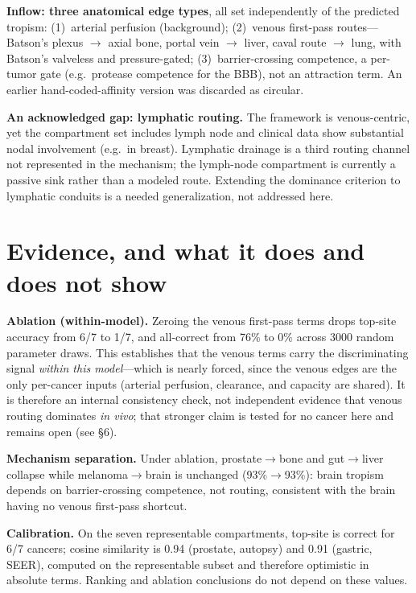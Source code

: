 \documentclass[11pt]{article}
\begin{document}
\textbf{Inflow: three anatomical edge types}, all set independently of the
predicted tropism: (1)~arterial perfusion (background); (2)~venous first-pass
routes---Batson's plexus $\to$ axial bone, portal vein $\to$ liver, caval route
$\to$ lung, with Batson's valveless and pressure-gated; (3)~barrier-crossing
competence, a per-tumor gate (e.g.\ protease competence for the BBB), not an
attraction term. An earlier hand-coded-affinity version was discarded as circular.

\textbf{An acknowledged gap: lymphatic routing.} The framework is venous-centric,
yet the compartment set includes lymph node and clinical data show substantial
nodal involvement (e.g.\ in breast). Lymphatic drainage is a third routing channel
not represented in the mechanism; the lymph-node compartment is currently a
passive sink rather than a modeled route. Extending the dominance criterion to
lymphatic conduits is a needed generalization, not addressed here.

\section{Evidence, and what it does and does not show}

\textbf{Ablation (within-model).} Zeroing the venous first-pass terms drops
top-site accuracy from 6/7 to 1/7, and all-correct from 76\% to 0\% across 3000
random parameter draws. This establishes that the venous terms carry the
discriminating signal \emph{within this model}---which is nearly forced, since the
venous edges are the only per-cancer inputs (arterial perfusion, clearance, and
capacity are shared). It is therefore an internal consistency check, not
independent evidence that venous routing dominates \emph{in vivo}; that stronger
claim is tested for no cancer here and remains open (see \S6).

\textbf{Mechanism separation.} Under ablation, prostate$\to$bone and gut$\to$liver
collapse while melanoma$\to$brain is unchanged (93\%$\to$93\%): brain tropism
depends on barrier-crossing competence, not routing, consistent with the brain
having no venous first-pass shortcut.

\textbf{Calibration.} On the seven representable compartments, top-site is correct
for 6/7 cancers; cosine similarity is 0.94 (prostate, autopsy) and 0.91 (gastric,
SEER), computed on the representable subset and therefore optimistic in absolute
terms. Ranking and ablation conclusions do not depend on these values.
\end{document}
